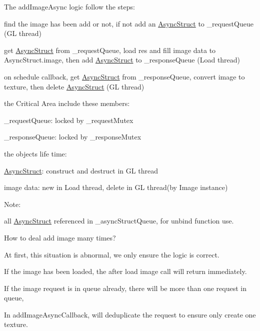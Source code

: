 The add\+Image\+Async logic follow the steps\+:
\begin{DoxyItemize}
\item find the image has been add or not, if not add an \hyperlink{structTextureCache_1_1AsyncStruct}{Async\+Struct} to \+\_\+request\+Queue (GL thread)
\item get \hyperlink{structTextureCache_1_1AsyncStruct}{Async\+Struct} from \+\_\+request\+Queue, load res and fill image data to Async\+Struct.\+image, then add \hyperlink{structTextureCache_1_1AsyncStruct}{Async\+Struct} to \+\_\+response\+Queue (Load thread)
\item on schedule callback, get \hyperlink{structTextureCache_1_1AsyncStruct}{Async\+Struct} from \+\_\+response\+Queue, convert image to texture, then delete \hyperlink{structTextureCache_1_1AsyncStruct}{Async\+Struct} (GL thread)
\end{DoxyItemize}

the Critical Area include these members\+:
\begin{DoxyItemize}
\item \+\_\+request\+Queue\+: locked by \+\_\+request\+Mutex
\item \+\_\+response\+Queue\+: locked by \+\_\+response\+Mutex
\end{DoxyItemize}

the object\textquotesingle{}s life time\+:
\begin{DoxyItemize}
\item \hyperlink{structTextureCache_1_1AsyncStruct}{Async\+Struct}\+: construct and destruct in GL thread
\item image data\+: new in Load thread, delete in GL thread(by Image instance)
\end{DoxyItemize}

Note\+:
\begin{DoxyItemize}
\item all \hyperlink{structTextureCache_1_1AsyncStruct}{Async\+Struct} referenced in \+\_\+async\+Struct\+Queue, for unbind function use.
\end{DoxyItemize}

How to deal add image many times?
\begin{DoxyItemize}
\item At first, this situation is abnormal, we only ensure the logic is correct.
\item If the image has been loaded, the after load image call will return immediately.
\item If the image request is in queue already, there will be more than one request in queue,
\item In add\+Image\+Async\+Callback, will deduplicate the request to ensure only create one texture.
\end{DoxyItemize}

